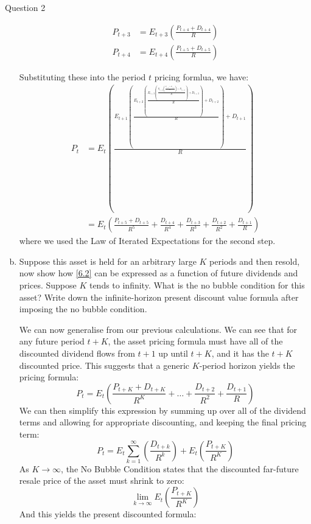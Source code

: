 \documentclass[a4paper]{article}
\begin{document}
\begin{questionbox}{Question 2}
\begin{enumerate}[(a)]
\begin{explanationbox}
\begin{align*}
					P_{t+3} &= E_{t+3} \left( \frac{P_{t+4} + D_{t+4}}{R} \right)\\
					P_{t+4} &= E_{t+4} \left( \frac{P_{t+5} + D_{t+5}}{R} \right)
				\end{align*}
			\end{explanationbox}
			\begin{explanationbox}
				Substituting these into the period \( t \) pricing formlua, we have:
				\begin{align*}
					P_t &= E_t \left( \frac{E_{t+1} \left( \frac{E_{t+2} \left( \frac{E_{t+3} \left( \frac{E_{t+4} \left( \frac{P_{t+5} + D_{t+5}}{R} \right) + D_{t+4}}{R} \right) + D_{t+3}}{R} \right) + D_{t+2}}{R} \right) + D_{t+1}}{R} \right)\\
					&= E_t \left( \frac{P_{t+5} + D_{t+5}}{R^5} + \frac{D_{t+4}}{R^4}+ \frac{D_{t+3}}{R^3}+ \frac{D_{t+2}}{R^2} + \frac{D_{t+1}}{R} \right)
				\end{align*}
				where we used the Law of Iterated Expectations for the second step.
			\end{explanationbox}
			\item Suppose this asset is held for an arbitrary large \( K \) periods and then resold, now show how \cref{6.2} can be expressed as a function of future dividends and prices. Suppose \( K \) tends to inﬁnity. What is the no bubble condition for this asset? Write down the inﬁnite-horizon present discount value formula after imposing the no bubble condition.
			\begin{explanationbox}
				We can now generalise from our previous calculations. We can see that for any future period \( t+K \), the asset pricing formula must have all of the discounted dividend ﬂows from \( t+1 \) up until \( t+K \), and it has the \( t+K \) discounted price. This suggests that a generic \( K \)-period horizon yields the pricing formula:
				\[
					P_t = E_t \left( \frac{P_{t+K} + D_{t+K}}{R^K} + \dots + \frac{D_{t+2}}{R^2} + \frac{D_{t+1}}{R} \right)
				\]
				We can then simplify this expression by summing up over all of the dividend terms and allowing for appropriate discounting, and keeping the ﬁnal pricing term:
				\[
					P_t = E_t \sum_{k=1}^\infty \left( \frac{D_{t+k}}{R^k} \right) + E_t \left( \frac{P_{t+K}}{R^K} \right)
				\]
				As \( K\rightarrow\infty \), the No Bubble Condition states that the discounted far-future resale price of the asset must shrink to zero:
				\[
					\lim_{k\rightarrow\infty} E_t \left( \frac{P_{t+K}}{R^K} \right)
				\]
				And this yields the present discounted formula:
				\[
\]
\end{explanationbox}
\end{enumerate}
\end{questionbox}
\end{document}
